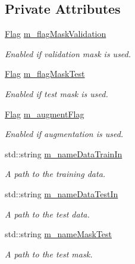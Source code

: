 \subsection*{Private Attributes}
\begin{DoxyCompactItemize}
\item 
\hyperlink{classDataReader_a4d7ac2e743b4d00d62ce3ac86dd35f76}{Flag} \hyperlink{classDataReader_a047fea2d4cf25627f3df820b560d95be}{m\+\_\+flag\+Mask\+Validation}
\begin{DoxyCompactList}\small\item\em Enabled if validation mask is used. \end{DoxyCompactList}\item 
\hyperlink{classDataReader_a4d7ac2e743b4d00d62ce3ac86dd35f76}{Flag} \hyperlink{classDataReader_a71945ad4af9366b1d4060d49e01e34f9}{m\+\_\+flag\+Mask\+Test}
\begin{DoxyCompactList}\small\item\em Enabled if test mask is used. \end{DoxyCompactList}\item 
\hyperlink{classDataReader_a4d7ac2e743b4d00d62ce3ac86dd35f76}{Flag} \hyperlink{classDataReader_a09cceda2cf4ac5522c6e05b1424660d4}{m\+\_\+augment\+Flag}
\begin{DoxyCompactList}\small\item\em Enabled if augmentation is used. \end{DoxyCompactList}\item 
std\+::string \hyperlink{classDataReader_a0fe9a400035e0ce40b7f9adee9759fd3}{m\+\_\+name\+Data\+Train\+In}
\begin{DoxyCompactList}\small\item\em A path to the training data. \end{DoxyCompactList}\item 
std\+::string \hyperlink{classDataReader_ad1604383cd367336e8d3aa00ef3b4396}{m\+\_\+name\+Data\+Test\+In}
\begin{DoxyCompactList}\small\item\em A path to the test data. \end{DoxyCompactList}\item 
std\+::string \hyperlink{classDataReader_ad0b4aa478a29fe29c71230d6ba1582ce}{m\+\_\+name\+Mask\+Test}
\begin{DoxyCompactList}\small\item\em A path to the test mask. \end{DoxyCompactList}\item 

\end{DoxyCompactItemize}

